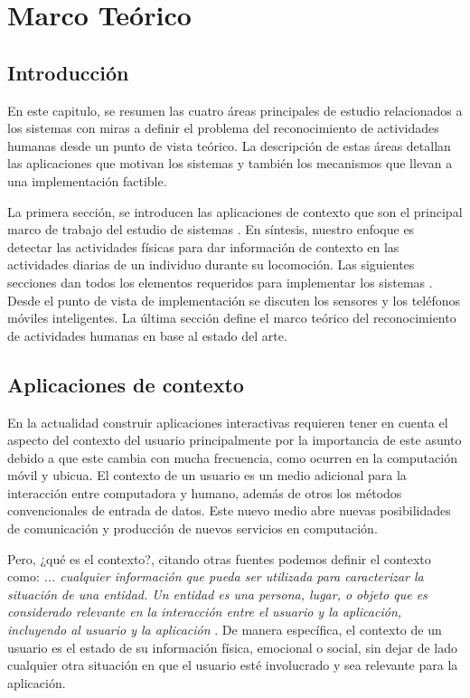 
\chapter{Marco Teórico}

\label{chap2:marco-teorico}

\section{Introducción}

\label{sec21:introduccion}En este capitulo, se resumen las cuatro
áreas principales de estudio relacionados a los sistemas 
con miras a definir el problema del reconocimiento de actividades
humanas desde un punto de vista teórico. La descripción de estas áreas
detallan las aplicaciones que motivan los sistemas  y también
los mecanismos que llevan a una implementación factible. 

La primera sección, se introducen las aplicaciones de contexto que
son el principal marco de trabajo del estudio de sistemas .
En síntesis, nuestro enfoque es detectar las actividades físicas para
dar información de contexto en las actividades diarias de un individuo
durante su locomoción. Las siguientes secciones dan todos los elementos
requeridos para implementar los sistemas . Desde el punto
de vista de implementación se discuten los sensores y los teléfonos
móviles inteligentes. La última sección define el marco teórico del
reconocimiento de actividades humanas en base al estado del arte.

\section{Aplicaciones de contexto}

\label{sec22:contexto}En la actualidad construir aplicaciones interactivas
requieren tener en cuenta el aspecto del contexto del usuario principalmente
por la importancia de este asunto debido a que este cambia con mucha
frecuencia, como ocurren en la computación móvil y ubicua. El contexto
de un usuario es un medio adicional para la interacción entre computadora
y humano, además de otros los métodos convencionales de entrada de
datos. Este nuevo medio abre nuevas posibilidades de comunicación
y producción de nuevos servicios en computación. 

Pero, ¿qué es el contexto?, citando otras fuentes podemos definir
el contexto como: \textquotedbl{}\emph{... cualquier información que
pueda ser utilizada para caracterizar la situación de una entidad.
Un entidad es una persona, lugar, o objeto que es considerado relevante
en la interacción entre el usuario y la aplicación, incluyendo al
usuario y la aplicación}\textquotedbl{} \cite{Dey2000}. De manera
específica, el contexto de un usuario es el estado de su información
física, emocional o social, sin dejar de lado cualquier otra situación
en que el usuario esté involucrado y sea relevante para la aplicación.

